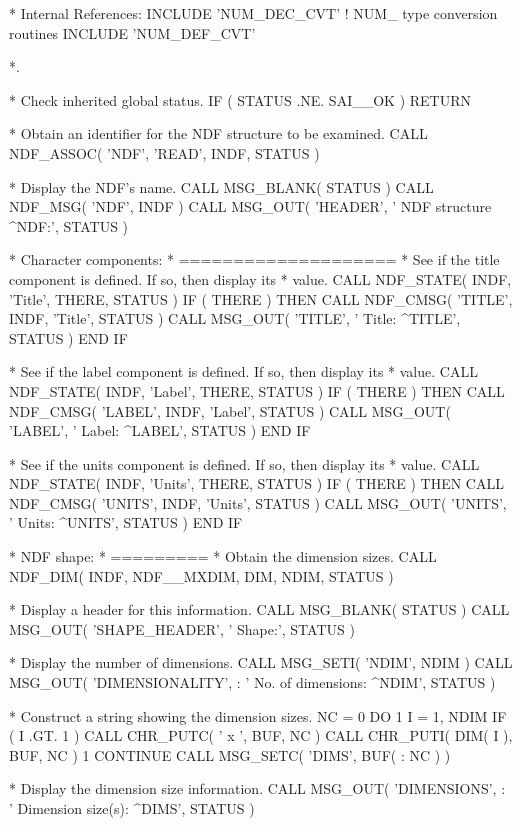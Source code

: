 \documentclass[twoside,11pt,nolof]{starlink}
\begin{document}
\begin{terminalv}
*  Internal References:
      INCLUDE 'NUM_DEC_CVT'      ! NUM_ type conversion routines
      INCLUDE 'NUM_DEF_CVT'

*.

*  Check inherited global status.
      IF ( STATUS .NE. SAI__OK ) RETURN

*  Obtain an identifier for the NDF structure to be examined.
      CALL NDF_ASSOC( 'NDF', 'READ', INDF, STATUS )

*  Display the NDF's name.
      CALL MSG_BLANK( STATUS )
      CALL NDF_MSG( 'NDF', INDF )
      CALL MSG_OUT( 'HEADER', '   NDF structure ^NDF:', STATUS )

*  Character components:
*  ====================
*  See if the title component is defined. If so, then display its
*  value.
      CALL NDF_STATE( INDF, 'Title', THERE, STATUS )
      IF ( THERE ) THEN
         CALL NDF_CMSG( 'TITLE', INDF, 'Title', STATUS )
         CALL MSG_OUT( 'TITLE', '      Title:  ^TITLE', STATUS )
      END IF

*  See if the label component is defined. If so, then display its
*  value.
      CALL NDF_STATE( INDF, 'Label', THERE, STATUS )
      IF ( THERE ) THEN
         CALL NDF_CMSG( 'LABEL', INDF, 'Label', STATUS )
         CALL MSG_OUT( 'LABEL', '      Label:  ^LABEL', STATUS )
      END IF

*  See if the units component is defined. If so, then display its
*  value.
      CALL NDF_STATE( INDF, 'Units', THERE, STATUS )
      IF ( THERE ) THEN
         CALL NDF_CMSG( 'UNITS', INDF, 'Units', STATUS )
         CALL MSG_OUT( 'UNITS', '      Units:  ^UNITS', STATUS )
      END IF

*  NDF shape:
*  =========
*  Obtain the dimension sizes.
      CALL NDF_DIM( INDF, NDF__MXDIM, DIM, NDIM, STATUS )

*  Display a header for this information.
      CALL MSG_BLANK( STATUS )
      CALL MSG_OUT( 'SHAPE_HEADER', '   Shape:', STATUS )

*  Display the number of dimensions.
      CALL MSG_SETI( 'NDIM', NDIM )
      CALL MSG_OUT( 'DIMENSIONALITY',
     : '      No. of dimensions:  ^NDIM', STATUS )

*  Construct a string showing the dimension sizes.
      NC = 0
      DO 1 I = 1, NDIM
          IF ( I .GT. 1 ) CALL CHR_PUTC( ' x ', BUF, NC )
          CALL CHR_PUTI( DIM( I ), BUF, NC )
 1    CONTINUE
      CALL MSG_SETC( 'DIMS', BUF( : NC ) )

*  Display the dimension size information.
      CALL MSG_OUT( 'DIMENSIONS',
     : '      Dimension size(s):  ^DIMS', STATUS )


\end{terminalv}
\end{document}
